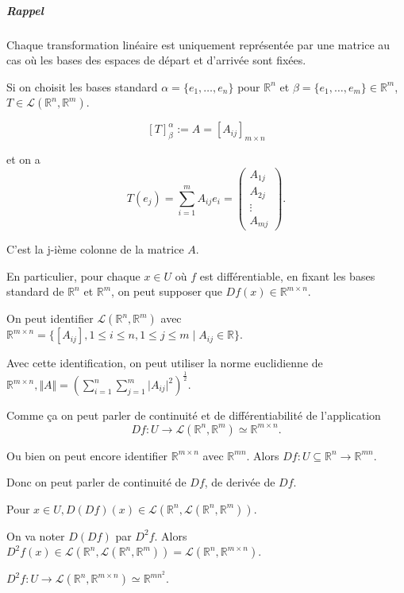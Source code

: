 \documentclass[french]{article}
\theoremstyle{definition}
\begin{document}
\subparagraph{Rappel} Chaque transformation linéaire est uniquement représentée par une matrice au cas où les bases des espaces de départ et d'arrivée sont fixées.

Si on choisit les bases standard $\alpha = \{ e_1, \dots, e_n \} $ pour $ \mathbb{R}^n$ et $ \beta = \{ e_1, \dots, e_m \} \in \mathbb{R}^m $, $T \in \mathscr{L}(\mathbb{R}^n, \mathbb{R}^m) $.

$$ [T] _{\beta } ^{\alpha} := A = [A _{ij}] _{m \times n}$$

et on a $$ T(e_j) = \sum_{i=1}^{m} A _{ij} e_i  = \begin{pmatrix}
  A _{1j} \\
  A _{2j} \\
  \vdots \\
  A _{mj}
\end{pmatrix}.$$

C'est la j-ième colonne de la matrice $A$.

En particulier, pour chaque $x \in U$ où $f$ est différentiable, en fixant les bases standard de $\mathbb{R}^n$ et $\mathbb{R}^m$, on peut supposer que $Df(x) \in \mathbb{R} ^{m \times n}$.

On peut identifier $\mathscr{L}(\mathbb{R}^n, \mathbb{R}^m) $ avec $\mathbb{R} ^{m \times n} = \{ [A _{ij}], 1 \leq i \leq n, 1 \leq j \leq m \mid A _{ij} \in \mathbb{R}\} $.

Avec cette identification, on peut utiliser la norme euclidienne de $\mathbb{R} ^{m \times n}, \Vert A \Vert = \left( \sum_{i=1}^{n} \sum_{j=1}^{m} \lvert A _{ij} \rvert ^2 \right) ^{\frac{1}{2}}  $.

Comme ça on peut parler de continuité et de différentiabilité de l'application $$Df : U \to \mathscr{L}(\mathbb{R}^n, \mathbb{R}^m) \simeq \mathbb{R}^{m\times n}.$$

Ou bien on peut encore identifier $\mathbb{R} ^{m \times n}$ avec $\mathbb{R} ^{mn}$. Alors $Df : U \subseteq \mathbb{R}^n \to \mathbb{R} ^{mn}$.

Donc on peut parler de continuité de $Df $, de derivée de $Df$.

Pour $x \in U, D(Df)(x) \in \mathscr{L}(\mathbb{R}^n, \mathscr{L}(\mathbb{R}^n, \mathbb{R}^m) ) $.

On va noter $D(Df)$ par $D ^2f$. Alors $D ^2 f (x) \in \mathscr{L}(\mathbb{R}^n, \mathscr{L}(\mathbb{R}^n, \mathbb{R}^m) ) = \mathscr{L}(\mathbb{R}^n, \mathbb{R}^{m\times n})  $.

$D ^2 f : U \to \mathscr{L}(\mathbb{R}^n, \mathbb{R} ^{m \times n}) \simeq \mathbb{R} ^{mn ^2} $.
\end{document}

